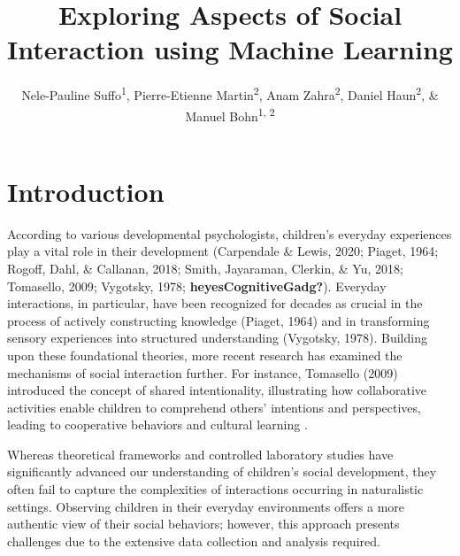 \documentclass[
  man,floatsintext]{apa6}
\title{Exploring Aspects of Social Interaction using Machine Learning}
\author{Nele-Pauline Suffo\textsuperscript{1}, Pierre-Etienne Martin\textsuperscript{2}, Anam Zahra\textsuperscript{2}, Daniel Haun\textsuperscript{2}, \& Manuel Bohn\textsuperscript{1, 2}}
\date{}
\affiliation{\vspace{0.5cm}\textsuperscript{1} Institute of Psychology in Education, Leuphana University Lüneburg\\\textsuperscript{2} Max Planck Institute for Evolutionary Anthropology}
\begin{document}
\maketitle

\section{Introduction}\label{introduction}

According to various developmental psychologists, children's everyday experiences play a vital role in their development (Carpendale \& Lewis, 2020; Piaget, 1964; Rogoff, Dahl, \& Callanan, 2018; Smith, Jayaraman, Clerkin, \& Yu, 2018; Tomasello, 2009; Vygotsky, 1978; \textbf{heyesCognitiveGadg?}). Everyday interactions, in particular, have been recognized for decades as crucial in the process of actively constructing knowledge (Piaget, 1964) and in transforming sensory experiences into structured understanding (Vygotsky, 1978). Building upon these foundational theories, more recent research has examined the mechanisms of social interaction further. For instance, Tomasello (2009) introduced the concept of shared intentionality, illustrating how collaborative activities enable children to comprehend others' intentions and perspectives, leading to cooperative behaviors and cultural learning .

Whereas theoretical frameworks and controlled laboratory studies have significantly advanced our understanding of children's social development, they often fail to capture the complexities of interactions occurring in naturalistic settings. Observing children in their everyday environments offers a more authentic view of their social behaviors; however, this approach presents challenges due to the extensive data collection and analysis required.
\end{document}
